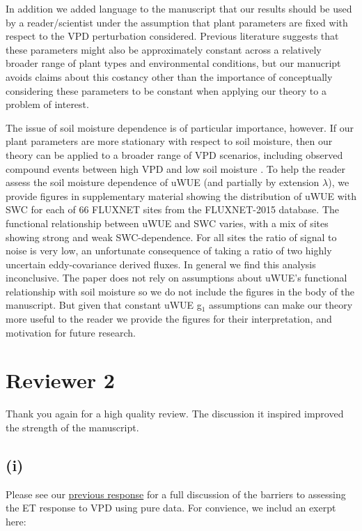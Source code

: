 \documentclass[12pt]{article}
\begin{document}
In addition we added language to the manuscript that our results
should be used by a reader/scientist under the assumption that plant
parameters are fixed with respect to the VPD perturbation
considered. Previous literature \citep{Zhou_2015, Lin_2015} suggests
that these parameters might also be approximately constant across a
relatively broader range of plant types and environmental conditions,
but our manucript avoids claims about this costancy other than the
importance of conceptually considering these parameters to be constant
when applying our theory to a problem of interest.

The issue of soil moisture dependence is of particular importance,
however. If our plant parameters are more stationary with respect to
soil moisture, then our theory can be applied to a broader range of
VPD scenarios, including observed compound events between high VPD and
low soil moisture \citep{Zhou_2019}. To help the reader assess the
soil moisture dependence of uWUE (and partially by extension
$\lambda$), we provide figures in supplementary material showing the
distribution of uWUE with SWC for each of 66 FLUXNET sites from the
FLUXNET-2015 database. The functional relationship between uWUE and
SWC varies, with a mix of sites showing strong and weak
SWC-dependence. For all sites the ratio of signal to noise is very
low, an unfortunate consequence of taking a ratio of two highly
uncertain eddy-covariance derived fluxes. In general we find this
analysis inconclusive. The paper does not rely on assumptions about
uWUE's functional relationship with soil moisture so we do not include
the figures in the body of the manuscript. But given that constant
uWUE g$_1$ assumptions can make our theory more useful to the reader
we provide the figures for their interpretation, and motivation for
future research.


\section{Reviewer 2}

Thank you again for a high quality review. The discussion it
inspired improved the strength of the manuscript.

\subsection{(i)}
\label{(i)}
Please see our
\href{https://www.hydrol-earth-syst-sci-discuss.net/hess-2018-553/hess-2018-553-AC2-supplement.pdf}{previous
  response} for a full discussion of the barriers to assessing the ET
response to VPD using pure data. For convience, we includ an exerpt
here:
\end{document}
